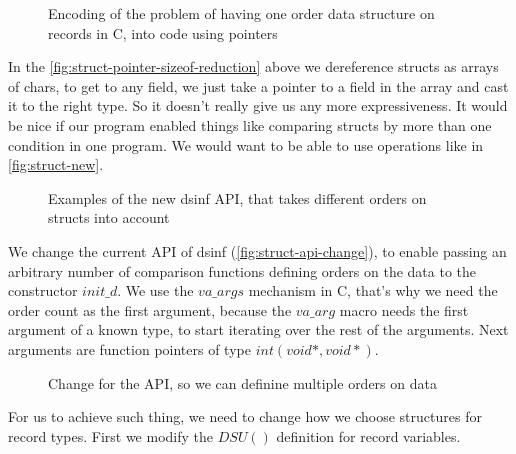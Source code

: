 \documentclass[a4paper,11pt]{article}
\begin{document}
            \begin{figure}[h!]
				

				\caption{Encoding of the problem of having one order data structure on records in C,
				into code using pointers}

				\label{fig:struct-pointer-sizeof-reduction}
			\end{figure}

			In the \autoref{fig:struct-pointer-sizeof-reduction} above we dereference structs as arrays of
			chars, to get to any field, we just take a pointer to a field in the array and cast it to the
			right type. So it doesn't really give us any more expressiveness. It would be nice if our
			program enabled things like comparing structs by more than one condition in one program. We
			would want to be able to use operations like in \autoref{fig:struct-new}.

            \begin{figure}[h!]
				

				\caption{Examples of the new dsinf API, that takes different orders on structs into
				account}

				\label{fig:struct-new}
			\end{figure}

            We change the current API of dsinf (\autoref{fig:struct-api-change}), to enable passing an arbitrary number
            of comparison functions defining orders on the data to the constructor $init\_d$. We use the $va\_args$
            mechanism in C, that's why we need the order count as the first argument, because the $va\_arg$ macro needs
            the first argument of a known type, to start iterating over the rest of the arguments. Next arguments are
            function pointers of type $int(void *, void *)$.

            \begin{figure}[h!]
				

				\caption{Change for the API, so we can definine multiple orders on data}

				\label{fig:struct-api-change}
			\end{figure}

			For us to achieve such thing, we need to change how we choose structures for record types. First
			we modify the $DSU()$ definition for record variables.
\end{document}
